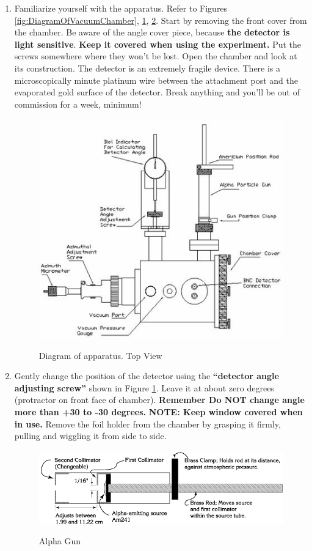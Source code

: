 \documentclass{../lab}
\begin{document}
\begin{enumerate}
    \item Familiarize yourself with the apparatus. Refer to Figures \ref{fig:DiagramOfVacuumChamber}, \ref{fig:DiagramOfApparatusTopView}, \ref{fig:AlphaGun}. Start by removing the front cover from the chamber. Be aware of the angle cover piece, because \textbf{the detector is light sensitive}. \textbf{Keep it covered when using the experiment.} Put the screws somewhere where they won't be lost. Open the chamber and look at its construction. The detector is an extremely fragile device. There is a microscopically minute platinum wire between the attachment post and the evaporated gold surface of the detector. Break anything and you'll be out of commission for a week, minimum!
    
    \newpage

    \begin{figure}[h]
        \centering
        \href{http://experimentationlab.berkeley.edu/sites/default/files/images/RUT13.jpg}{\includegraphics[width=0.5\linewidth]{images/RUT13.jpg}}
        \caption{Diagram of apparatus. Top View}
        \label{fig:DiagramOfApparatusTopView}
    \end{figure}

    \item Gently change the position of the detector using the \textbf{``detector angle adjusting screw''} shown in Figure \ref{fig:DiagramOfApparatusTopView}. Leave it at about zero degrees (protractor on front face of chamber). \textbf{Remember Do NOT change angle more than +30 to -30 degrees.} \textbf{NOTE: Keep window covered when in use.} Remove the foil holder from the chamber by grasping it firmly, pulling and wiggling it from side to side.

    \begin{figure}[h]
        \centering
        \href{http://experimentationlab.berkeley.edu/sites/default/files/images/RUT14.gif}{\includegraphics[width=0.5\linewidth]{images/RUT14.png}}
        \caption{Alpha Gun}
        \label{fig:AlphaGun}
    \end{figure}


\end{enumerate}
\end{document}
